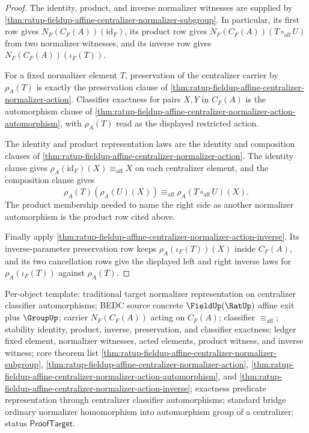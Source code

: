 \begin{proof}
The identity, product, and inverse normalizer witnesses are supplied by
\autoref{thm:ratup-fieldup-affine-centralizer-normalizer-subgroup}. In
particular, its first row gives $N_F(C_F(A))(\mathrm{id}_F)$, its product row
gives $N_F(C_F(A))(T\circ_{\mathrm{aff}}U)$ from two normalizer witnesses, and
its inverse row gives $N_F(C_F(A))(\iota_F(T))$.

For a fixed normalizer element $T$, preservation of the centralizer carrier by
$\rho_A(T)$ is exactly the preservation clause of
\autoref{thm:ratup-fieldup-affine-centralizer-normalizer-action}. Classifier
exactness for pairs $X,Y$ in $C_F(A)$ is the automorphism clause of
\autoref{thm:ratup-fieldup-affine-centralizer-normalizer-action-automorphism},
with $\rho_A(T)$ read as the displayed restricted action.

The identity and product representation laws are the identity and composition
clauses of
\autoref{thm:ratup-fieldup-affine-centralizer-normalizer-action}. The identity
clause gives $\rho_A(\mathrm{id}_F)(X)\equiv_{\mathrm{aff}}X$ on each
centralizer element, and the composition clause gives
$$
\rho_A(T)(\rho_A(U)(X))\equiv_{\mathrm{aff}}
\rho_A(T\circ_{\mathrm{aff}}U)(X).
$$
The product membership needed to name the right side as another normalizer
automorphism is the product row cited above.

Finally apply
\autoref{thm:ratup-fieldup-affine-centralizer-normalizer-action-inverse}. Its
inverse-parameter preservation row keeps $\rho_A(\iota_F(T))(X)$ inside
$C_F(A)$, and its two cancellation rows give the displayed left and right
inverse laws for $\rho_A(\iota_F(T))$ against $\rho_A(T)$.
\end{proof}

Per-object template: traditional target normalizer representation on
centralizer classifier automorphisms; BEDC source concrete $\FieldUp(\RatUp)$
affine exit plus $\GroupUp$; carrier $N_F(C_F(A))$ acting on $C_F(A)$;
classifier $\equiv_{\mathrm{aff}}$; stability identity, product, inverse,
preservation, and classifier exactness; ledger fixed element, normalizer
witnesses, acted elements, product witness, and inverse witness; core theorem
list \autoref{thm:ratup-fieldup-affine-centralizer-normalizer-subgroup},
\autoref{thm:ratup-fieldup-affine-centralizer-normalizer-action},
\autoref{thm:ratup-fieldup-affine-centralizer-normalizer-action-automorphism},
and
\autoref{thm:ratup-fieldup-affine-centralizer-normalizer-action-inverse};
exactness predicate representation through centralizer classifier
automorphisms; standard bridge ordinary normalizer homomorphism into
automorphism group of a centralizer; status $\mathsf{ProofTarget}$.

